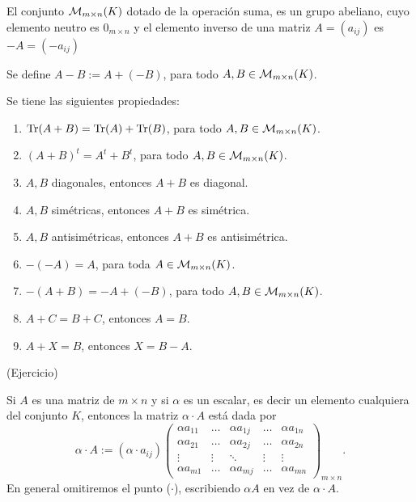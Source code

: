 \begin{thm}
El conjunto $\mathcal{M}_{m\times n}(K)$ dotado de la operaci\'on suma, es un grupo abeliano, cuyo elemento neutro es $0_{m\times n}$ y el elemento inverso de una matriz $A=(a_{ij})$ es $-A=(-a_{ij})$
\end{thm}

Se define $A - B := A + (-B)$, para todo $ A, B \in \mathcal{M}_{m\times n}(K)$.

\begin{thm}
Se tiene las siguientes propiedades:
\begin{enumerate}
    \item $\operatorname{Tr}(A+B) = \operatorname{Tr}(A) + \operatorname{Tr}(B)$, para todo $ A, B \in \mathcal{M}_{m\times n}(K)$.
    \item $(A + B)^t = A^t + B^t$, para todo $ A, B \in \mathcal{M}_{m\times n}(K)$.
    \item $A, B$ diagonales, entonces $A + B$ es diagonal.
    \item $A, B$ simétricas, entonces $A + B$ es simétrica.
    \item $A, B$ antisimétricas, entonces $A + B$ es antisimétrica.
    \item $- ( -A) = A$, para toda $ A \in \mathcal{M}_{m\times n}(K)$.
    \item $-(A + B) = -A + (-B)$, para todo $ A, B \in \mathcal{M}_{m\times n}(K)$.
    \item $ A + C = B + C$, entonces  $A = B$.
    \item $ A + X = B$, entonces $X = B - A$.
\end{enumerate}
\end{thm}
\proof (Ejercicio)


\begin{defin}
Si $A$ es una matriz de $m \times n$ y si $\alpha$ es un escalar, es decir un elemento cualquiera del conjunto $K$, entonces la matriz $\alpha \cdot A$ está dada por
\[\alpha \cdot A:=(\alpha \cdot a_{ij})\left(\begin{array}{ccccc}
     \alpha a_{11} & \dots &\alpha  a_{1j} &\dots &\alpha  a_{1n}\\
     \alpha a_{21} & \dots &\alpha  a_{2j} &\dots &\alpha  a_{2n}\\
     \vdots&  \vdots & \ddots &  \vdots &\vdots \\
     \alpha a_{m1} & \dots &\alpha  a_{mj} &\dots &\alpha  a_{mn}
\end{array}\right)_{m\times n}.\]
En general omitiremos el punto ($\cdot$), escribiendo $\alpha A$ en vez de $\alpha \cdot A$.
\end{defin}

